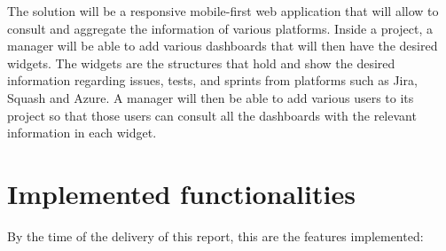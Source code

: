 \documentclass[a4paper,twoside,10pt]{report}
\begin{document}
The solution will be a responsive mobile-first web application that will allow to consult and aggregate the information of various platforms. Inside a project, a manager will be able to add various dashboards that will then have the desired widgets. The widgets are the structures that hold and show the desired information regarding issues, tests, and sprints from platforms such as Jira\cite{JIRA}, Squash\cite{SQUASH} and Azure\cite{AZURE}. A manager will then be able to add various users to its project so that those users can consult all the dashboards with the relevant information in each widget.
\section{Implemented functionalities}
By the time of the delivery of this report, this are the features implemented:
\\ \newline
\end{document}
